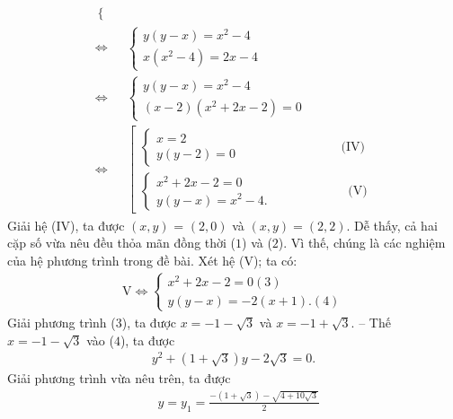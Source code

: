 \begin{multicols}{2}
{{\begin{align*}
\begin{cases}
		\end{cases}\\
	\Leftrightarrow & \begin{cases}
		y\left( {y - x} \right) = {x^2} - 4\\
		x\left( {{x^2} - 4} \right) = 2x - 4
	\end{cases}\\
	\Leftrightarrow & \begin{cases}
		y\left( {y - x} \right) = {x^2} - 4\\
		\left( {x - 2} \right)\left( {{x^2} + 2x - 2} \right) = 0
	\end{cases} \\
	\Leftrightarrow & \left[ \begin{array}{l}
		\begin{cases}
			x = 2\\
			y\left( {y - 2} \right) = 0
		\end{cases} \quad\quad\quad\quad\quad\quad\quad\quad\!\!\text{(IV)}\\
		\begin{cases}
			{x^2} + 2x - 2 = 0\\
			y\left( {y - x} \right) = {x^2} - 4.
		\end{cases}\quad\quad\quad\quad\quad\quad\text{(V)}
	\end{array} \right.
	\end{align*}}}
	\vskip 0.05cm
	Giải hệ ($\text{IV}$), ta được $(x, y)$ = $(2, 0)$ và $(x, y) = (2, 2)$. Dễ thấy, cả hai cặp số vừa nêu đều thỏa mãn đồng thời ($1$) và ($2$). Vì thế, chúng là các nghiệm của hệ phương trình trong đề bài.
	\vskip 0.05cm
	Xét hệ ($\text{V}$); ta có:
	\begin{align*}
		\text{V} \Leftrightarrow \left\{ \begin{array}{l}
			{x^2} + 2x - 2 = 0\left( 3 \right)\\
			y\left( {y - x} \right) =  - 2\left( {x + 1} \right).\left( 4 \right)
		\end{array} \right.
	\end{align*}
	Giải phương trình ($3$), ta được $x = -1 - \sqrt{3}$  và $x = -1 + \sqrt{3}$.
	\vskip 0.05cm 
	-- Thế $x = -1 - \sqrt{3}$  vào ($4$), ta được
	\begin{align*}
		{y^2} + \left( {1 + \sqrt 3 } \right)y - 2\sqrt 3  = 0.
	\end{align*}
	Giải phương trình vừa nêu trên, ta được
	\begin{align*}
		&y = {y_1} = \frac{{ - \left( {1 + \sqrt 3 } \right) - \sqrt {4 + 10\sqrt 3 } }}{2} \\

\end{align*}
\end{multicols}
